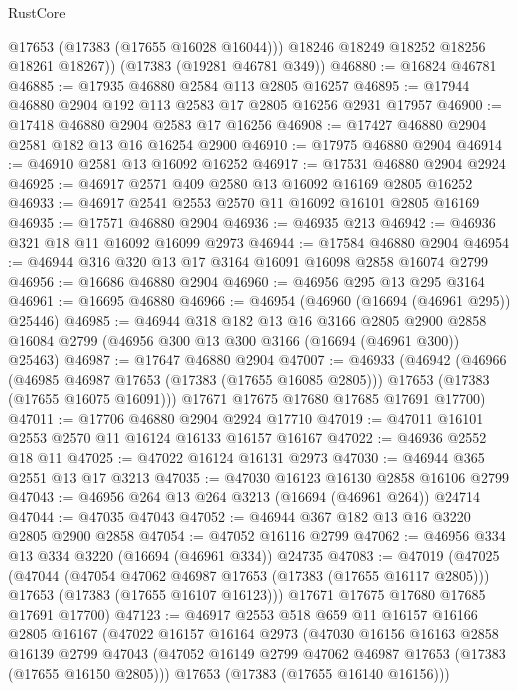 \begin{lexlean}{RustCore}
\begin{coremodule}
          @17653
          (@17383 (@17655 @16028 @16044)))
        @18246
        @18249
        @18252
        @18256
        @18261
        @18267))
    (@17383 (@19281 @46781 @349))
@46880 := @16824 @46781
@46885 := @17935 @46880 @2584 @113 @2805 @16257
@46895 := @17944 @46880 @2904 @192 @113 @2583 @17 @2805 @16256 @2931 @17957
@46900 := @17418 @46880 @2904 @2583 @17 @16256
@46908 := @17427 @46880 @2904 @2581 @182 @13 @16 @16254 @2900
@46910 := @17975 @46880 @2904
@46914 := @46910 @2581 @13 @16092 @16252
@46917 := @17531 @46880 @2904 @2924
@46925 := @46917 @2571 @409 @2580 @13 @16092 @16169 @2805 @16252
@46933 := @46917 @2541 @2553 @2570 @11 @16092 @16101 @2805 @16169
@46935 := @17571 @46880 @2904
@46936 := @46935 @213
@46942 := @46936 @321 @18 @11 @16092 @16099 @2973
@46944 := @17584 @46880 @2904
@46954 := @46944 @316 @320 @13 @17 @3164 @16091 @16098 @2858 @16074 @2799
@46956 := @16686 @46880 @2904
@46960 := @46956 @295 @13 @295 @3164
@46961 := @16695 @46880
@46966 := @46954 (@46960 (@16694 (@46961 @295)) @25446)
@46985 := @46944
    @318
    @182
    @13
    @16
    @3166
    @2805
    @2900
    @2858
    @16084
    @2799
    (@46956 @300 @13 @300 @3166 (@16694 (@46961 @300)) @25463)
@46987 := @17647 @46880 @2904
@47007 := @46933
    (@46942
      (@46966
        (@46985 @46987 @17653 (@17383 (@17655 @16085 @2805)))
        @17653
        (@17383 (@17655 @16075 @16091)))
      @17671
      @17675
      @17680
      @17685
      @17691
      @17700)
@47011 := @17706 @46880 @2904 @2924 @17710
@47019 := @47011 @16101 @2553 @2570 @11 @16124 @16133 @16157 @16167
@47022 := @46936 @2552 @18 @11
@47025 := @47022 @16124 @16131 @2973
@47030 := @46944 @365 @2551 @13 @17 @3213
@47035 := @47030 @16123 @16130 @2858 @16106 @2799
@47043 := @46956 @264 @13 @264 @3213 (@16694 (@46961 @264)) @24714
@47044 := @47035 @47043
@47052 := @46944 @367 @182 @13 @16 @3220 @2805 @2900 @2858
@47054 := @47052 @16116 @2799
@47062 := @46956 @334 @13 @334 @3220 (@16694 (@46961 @334)) @24735
@47083 := @47019
    (@47025
      (@47044
        (@47054 @47062 @46987 @17653 (@17383 (@17655 @16117 @2805)))
        @17653
        (@17383 (@17655 @16107 @16123)))
      @17671
      @17675
      @17680
      @17685
      @17691
      @17700)
@47123 := @46917
    @2553
    @518
    @659
    @11
    @16157
    @16166
    @2805
    @16167
    (@47022
      @16157
      @16164
      @2973
      (@47030
        @16156
        @16163
        @2858
        @16139
        @2799
        @47043
        (@47052 @16149 @2799 @47062 @46987 @17653 (@17383 (@17655 @16150 @2805)))
        @17653
        (@17383 (@17655 @16140 @16156)))

\end{coremodule}
\end{lexlean}

